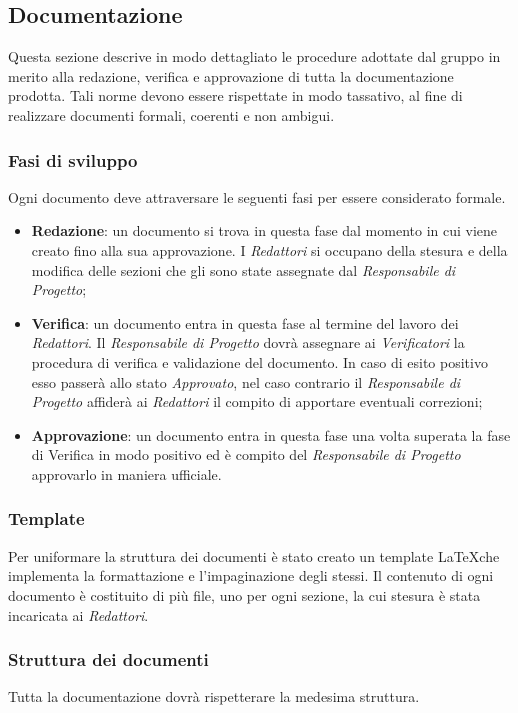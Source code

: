 \subsection{Documentazione}
Questa sezione descrive in modo dettagliato le procedure adottate dal gruppo in merito alla redazione, verifica e approvazione di tutta la documentazione prodotta. Tali norme devono essere rispettate in modo tassativo, al fine di realizzare documenti formali, coerenti e non ambigui.

\subsubsection{Fasi di sviluppo}
Ogni documento deve attraversare le seguenti fasi per essere considerato formale.
\begin{itemize}
	\item \textbf{Redazione}: un documento si trova in questa fase dal momento in cui viene creato fino alla sua approvazione. I \emph{Redattori} si occupano della stesura e della modifica delle sezioni che gli sono state assegnate dal \emph{Responsabile di Progetto};
	\item \textbf{Verifica}: un documento entra in questa fase al termine del lavoro dei \emph{Redattori}. Il \emph{Responsabile di Progetto} dovrà assegnare ai \emph{Verificatori} la procedura di verifica e validazione del documento. In caso di esito positivo esso passerà allo stato \emph{Approvato}, nel caso contrario il \emph{Responsabile di Progetto} affiderà ai \emph{Redattori} il compito di apportare eventuali correzioni;
	\item \textbf{Approvazione}: un documento entra in questa fase una volta superata la fase di Verifica in modo positivo ed è compito del \emph{Responsabile di Progetto} approvarlo in maniera ufficiale.
\end{itemize}

\subsubsection{Template}
Per uniformare la struttura dei documenti è stato creato un template \LaTeX che implementa la formattazione e l'impaginazione degli stessi. Il contenuto di ogni documento è costituito di più file, uno per ogni sezione, la cui stesura è stata incaricata ai \emph{Redattori}.

\subsubsection{Struttura dei documenti}
Tutta la documentazione dovrà rispetterare la medesima struttura.

